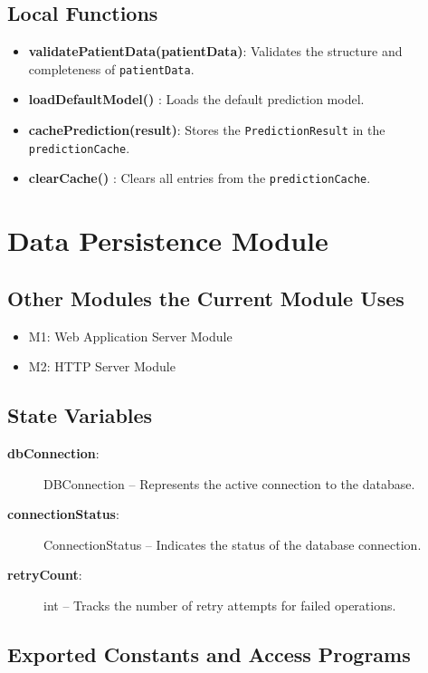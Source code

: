 \documentclass[12pt, titlepage]{article}
\begin{document}
\subsection{Local Functions}
\begin{itemize}
    \item \textbf{validatePatientData(patientData)}: Validates the structure and completeness of \texttt{patientData}.
    \item \textbf{loadDefaultModel()} : Loads the default prediction model.
    \item \textbf{cachePrediction(result)}: Stores the \texttt{PredictionResult} in the \texttt{predictionCache}.
    \item \textbf{clearCache()} : Clears all entries from the \texttt{predictionCache}.
\end{itemize}

\section{Data Persistence Module}
\label{Data Persistence Module}

\subsection{Other Modules the Current Module Uses}
\begin{itemize}
    \item M1: Web Application Server Module
    \item M2: HTTP Server Module
\end{itemize}

\subsection{State Variables}
\begin{description}
    \item[\textbf{dbConnection}:] DBConnection -- Represents the active connection to the database.
    \item[\textbf{connectionStatus}:] ConnectionStatus -- Indicates the status of the database connection.
    \item[\textbf{retryCount}:] int -- Tracks the number of retry attempts for failed operations.
\end{description}

\subsection{Exported Constants and Access Programs}
\end{document}
